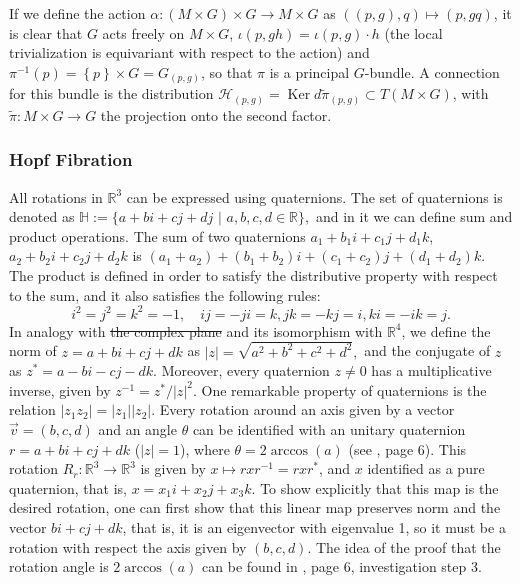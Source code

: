 \documentclass[12pt, letterpaper, reqno]{amsart}
\theoremstyle{definition}
\theoremstyle{plain}
\theoremstyle{remark}
\providecommand{\DIFadd}[1]{{\protect\color{blue}\uwave{#1}}} %
\providecommand{\DIFdel}[1]{{\protect\color{red}\sout{#1}}}                      %
\providecommand{\DIFaddbegin}{} %
\providecommand{\DIFaddend}{} %
\providecommand{\DIFdelbegin}{} %
\providecommand{\DIFdelend}{} %
\newcommand{\DIFscaledelfig}{0.5}
\newlength{\DIFdelgraphicswidth} %
\newlength{\DIFdelgraphicsheight} %
\newcommand{\DIFaddincludegraphics}[2][]{{\color{blue}\fbox{\DIFOincludegraphics[#1]{#2}}}} %
\newcommand{\DIFdelincludegraphics}[2][]{%
\sbox{\DIFdelgraphicsbox}{\DIFOincludegraphics[#1]{#2}}%
\settoboxwidth{\DIFdelgraphicswidth}{\DIFdelgraphicsbox} %
\settoboxtotalheight{\DIFdelgraphicsheight}{\DIFdelgraphicsbox} %
\scalebox{\DIFscaledelfig}{%
\parbox[b]{\DIFdelgraphicswidth}{\usebox{\DIFdelgraphicsbox}\\[-\baselineskip] \rule{\DIFdelgraphicswidth}{0em}}\llap{\resizebox{\DIFdelgraphicswidth}{\DIFdelgraphicsheight}{%
\setlength{\unitlength}{\DIFdelgraphicswidth}%
\begin{picture}(1,1)%
\thicklines\linethickness{2pt} %
{\color[rgb]{1,0,0}\put(0,0){\framebox(1,1){}}}%
{\color[rgb]{1,0,0}\put(0,0){\line( 1,1){1}}}%
{\color[rgb]{1,0,0}\put(0,1){\line(1,-1){1}}}%
\end{picture}%
}\hspace*{3pt}}} %
} %
\DeclareRobustCommand{\DIFaddbegin}{\DIFOaddbegin \let\includegraphics\DIFaddincludegraphics} %
\DeclareRobustCommand{\DIFaddend}{\DIFOaddend \let\includegraphics\DIFOincludegraphics} %
\DeclareRobustCommand{\DIFdelbegin}{\DIFOdelbegin \let\includegraphics\DIFdelincludegraphics} %
\DeclareRobustCommand{\DIFdelend}{\DIFOaddend \let\includegraphics\DIFOincludegraphics} %
\begin{document}
If we define the action $ \alpha: (M\times G) \times G \rightarrow M\times G $ as $ ((p, g),q)\mapsto (p,gq)  $, it is clear that $ G $ acts freely on $ M\times G $, $\iota(p, gh) = \iota(p,g)\cdot h $ (the local trivialization is equivariant with respect to the action) and $ \pi^{-1}(p) = \left\{ p \right\}\times G = G_{(p,g)} $, so that $ \pi $ is a principal $ G $-bundle. A connection for this bundle is the distribution $ \mathcal{H}_{(p,g)}= \operatorname{Ker} d\tilde{\pi}_(p,g)\subset T(M\times G) $, with $ \tilde{\pi}:M\times G \rightarrow G $ the projection onto the second factor.
\subsubsection{Hopf Fibration}%
\label{ssub:hopf_fibration}

All rotations in $ \mathbb{R}^3 $ can be expressed using quaternions. The set of quaternions is denoted as $ \mathbb{H} := \{ a+bi+cj+dj$  $|$  $a,b,c,d\in \mathbb{R} \}, $ and in it we can define sum and product operations. The sum of two quaternions $ a_1+b_1 i +c_1 j  + d_1k $, $ a_2+b_2 i +c_2 j  + d_2k $ is $ (a_1+a_2)+(b_1+b_2)i+(c_1+c_2)j+(d_1+d_2)k. $ The product is defined in order to satisfy the distributive property with respect to the sum, and it also satisfies the following rules: 
$$ i^2=j^2=k^2=-1, \quad ij=-ji=k, jk=-kj=i, ki = -ik=j.  $$ 
In analogy with \DIFdelbegin \DIFdel{the complex plane }\DIFdelend \DIFaddbegin \DIFadd{$\mathbb{C}^2$ }\DIFaddend and its isomorphism with $\mathbb{R}^4$, we define the norm of $ z= a+bi+cj+dk $ as $ |z|=\sqrt{a^2+b^2+c^2+d^2}, $ and the conjugate of $ z $ as $ z^* = a-bi-cj-dk. $ Moreover, every quaternion $ z\neq 0 $ has a multiplicative inverse, given by $ z^{-1} = z^*/|z|^2. $ One remarkable property of quaternions is the relation $ |z_1 z_2| = |z_1||z_2|. $  Every rotation around an axis given by a vector $ \vec{v}=(b,c,d) $ and an angle $ \theta $ can be identified with an unitary quaternion $r = a+bi+cj+dk$ ($|z|=1$),  where $ \theta = 2\arccos(a) $ (see \cite{lyons2003elementary}, page 6). This rotation $ R_r: \mathbb{R}^3 \rightarrow\mathbb{R}^3 $ is given by $ x\mapsto rxr^{-1}= rxr^*$, and $ x $ identified as a pure quaternion, that is, $ x=x_1i+x_2j+x_3k. $ To show explicitly that this map is the desired rotation, one can first show that this linear map preserves norm and the vector $ bi+cj+dk $, that is, it is an eigenvector with eigenvalue 1, so it must be a rotation with respect the axis given by $ (b,c,d) $. The idea of the proof that the rotation angle is $ 2\arccos(a) $ can be found in \cite{lyons2003elementary}, page 6, investigation step 3. 
\end{document}
